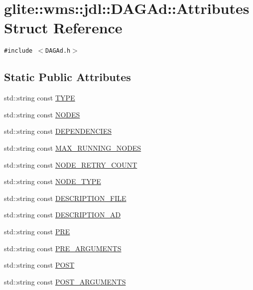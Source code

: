 \hypertarget{structglite_1_1wms_1_1jdl_1_1DAGAd_1_1Attributes}{
\section{glite::wms::jdl::DAGAd::Attributes Struct Reference}
\label{structglite_1_1wms_1_1jdl_1_1DAGAd_1_1Attributes}
}
{\tt \#include $<$DAGAd.h$>$}

\subsection*{Static Public Attributes}
\begin{CompactItemize}
\item 
std::string const  \hyperlink{structglite_1_1wms_1_1jdl_1_1DAGAd_1_1Attributes_s0}{TYPE}
\item 
std::string const  \hyperlink{structglite_1_1wms_1_1jdl_1_1DAGAd_1_1Attributes_s1}{NODES}
\item 
std::string const  \hyperlink{structglite_1_1wms_1_1jdl_1_1DAGAd_1_1Attributes_s2}{DEPENDENCIES}
\item 
std::string const  \hyperlink{structglite_1_1wms_1_1jdl_1_1DAGAd_1_1Attributes_s3}{MAX\_\-RUNNING\_\-NODES}
\item 
std::string const  \hyperlink{structglite_1_1wms_1_1jdl_1_1DAGAd_1_1Attributes_s4}{NODE\_\-RETRY\_\-COUNT}
\item 
std::string const  \hyperlink{structglite_1_1wms_1_1jdl_1_1DAGAd_1_1Attributes_s5}{NODE\_\-TYPE}
\item 
std::string const  \hyperlink{structglite_1_1wms_1_1jdl_1_1DAGAd_1_1Attributes_s6}{DESCRIPTION\_\-FILE}
\item 
std::string const  \hyperlink{structglite_1_1wms_1_1jdl_1_1DAGAd_1_1Attributes_s7}{DESCRIPTION\_\-AD}
\item 
std::string const  \hyperlink{structglite_1_1wms_1_1jdl_1_1DAGAd_1_1Attributes_s8}{PRE}
\item 
std::string const  \hyperlink{structglite_1_1wms_1_1jdl_1_1DAGAd_1_1Attributes_s9}{PRE\_\-ARGUMENTS}
\item 
std::string const  \hyperlink{structglite_1_1wms_1_1jdl_1_1DAGAd_1_1Attributes_s10}{POST}
\item 
std::string const  \hyperlink{structglite_1_1wms_1_1jdl_1_1DAGAd_1_1Attributes_s11}{POST\_\-ARGUMENTS}
\end{CompactItemize}


